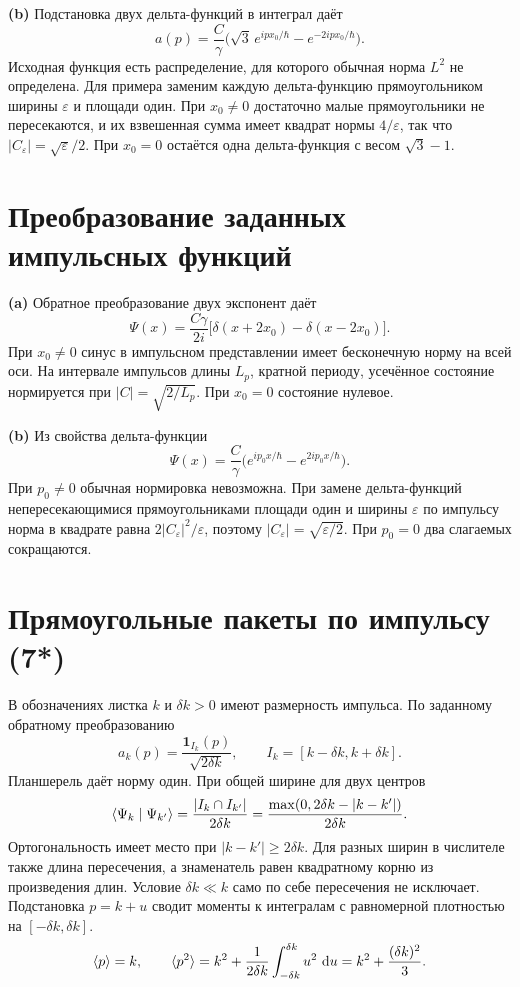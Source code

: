 \documentclass[11pt,a4paper]{article}
\begin{document}
\textbf{(b)} Подстановка двух дельта-функций в интеграл даёт
\[
 a(p)=\frac{C}{\gamma}\bigl(\sqrt3\,e^{ipx_0/\hbar}
                                      -e^{-2ipx_0/\hbar}\bigr).
\]
Исходная функция есть распределение, для которого обычная норма
\(L^2\) не определена. Для примера заменим каждую дельта-функцию
прямоугольником ширины \(\varepsilon\) и площади один.
При \(x_0\ne0\) достаточно малые прямоугольники не пересекаются,
и их взвешенная сумма имеет квадрат нормы \(4/\varepsilon\),
так что \(|C_\varepsilon|=\sqrt\varepsilon/2\).
При \(x_0=0\) остаётся одна дельта-функция с весом \(\sqrt3-1\).

\section{Преобразование заданных импульсных функций}

\textbf{(a)} Обратное преобразование двух экспонент даёт
\[
 \Psi(x)=\frac{C\gamma}{2i}
           \bigl[\delta(x+2x_0)-\delta(x-2x_0)\bigr].
\]
При \(x_0\ne0\) синус в импульсном представлении имеет бесконечную
норму на всей оси. На интервале импульсов длины \(L_p\), кратной
периоду, усечённое состояние нормируется при \(|C|=\sqrt{2/L_p}\).
При \(x_0=0\) состояние нулевое.

\textbf{(b)} Из свойства дельта-функции
\[
 \Psi(x)=\frac{C}{\gamma}\bigl(e^{ip_0x/\hbar}-e^{2ip_0x/\hbar}\bigr).
\]
При \(p_0\ne0\) обычная нормировка невозможна. При замене дельта-функций
непересекающимися прямоугольниками площади один и ширины
\(\varepsilon\) по импульсу норма в квадрате равна
\(2|C_\varepsilon|^2/\varepsilon\), поэтому
\(|C_\varepsilon|=\sqrt{\varepsilon/2}\).
При \(p_0=0\) два слагаемых сокращаются.

\section{Прямоугольные пакеты по импульсу (7*)}

В обозначениях листка \(k\) и \(\delta k>0\) имеют размерность
импульса. По заданному обратному преобразованию
\[
 a_k(p)=\frac{\mathbf 1_{I_k}(p)}{\sqrt{2\delta k}},
 \qquad I_k=[k-\delta k,k+\delta k].
\]
Планшерель даёт норму один. При общей ширине для двух центров
\[
 \langle \Psi_k\mid \Psi_{k'}\rangle=
 \frac{\lvert I_k\cap I_{k'}\rvert}{2\delta k}
 =\frac{\max(0,2\delta k-|k-k'|)}{2\delta k}.
\]
Ортогональность имеет место при \(|k-k'|\ge2\delta k\).
Для разных ширин в числителе также длина пересечения,
а знаменатель равен квадратному корню из произведения длин.
Условие \(\delta k\ll k\) само по себе пересечения не исключает.
Подстановка \(p=k+u\) сводит моменты к интегралам с равномерной
плотностью на \([-\delta k,\delta k]\).
\[
 \langle p\rangle=k,\qquad
 \langle p^2\rangle=k^2+\frac1{2\delta k}\int_{-\delta k}^{\delta k}u^2\,\mathop{}\!\mathrm{d} u
 =k^2+\frac{(\delta k)^2}{3}.
\]
\end{document}
